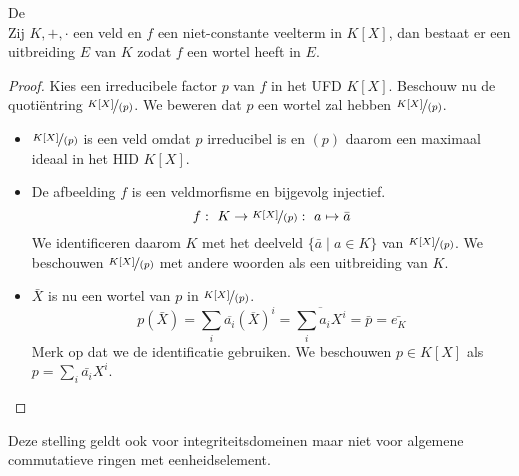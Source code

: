 \documentclass[main.tex]{subfiles}
\begin{document}
\begin{st}
  \label{st:fundamentele-stelling-van-veldentheorie}
  \examen
  De \\
  Zij $K,+,\cdot$ een veld en $f$ een niet-constante veelterm in $K[X]$, dan bestaat er een uitbreiding $E$ van $K$ zodat $f$ een wortel heeft in $E$.

  \begin{proof}
    Kies een irreducibele factor $p$ van $f$ in het UFD $K[X]$.
    Beschouw nu de quoti\"entring $\nicefrac{K[X]}{(p)}$.
    We beweren dat $p$ een wortel zal hebben $\nicefrac{K[X]}{(p)}$.
    \begin{itemize}
    \item $\nicefrac{K[X]}{(p)}$ is een veld omdat $p$ irreducibel is en $(p)$ daarom een maximaal ideaal in het HID $K[X]$.
    \item De afbeelding $f$ is een veldmorfisme en bijgevolg injectief.
      \[ f:\ K \rightarrow \nicefrac{K[X]}{(p)}:\ a \mapsto \bar{a} \]
      We identificeren daarom $K$ met het deelveld $\{ \bar{a} \mid a\in K \}$ van $\nicefrac{K[X]}{(p)}$.
      We beschouwen $\nicefrac{K[X]}{(p)}$ met andere woorden als een uitbreiding van $K$.
    \item $\bar{X}$ is nu een wortel van $p$ in $\nicefrac{K[X]}{(p)}$.
      \[ p(\bar{X}) = \sum_{i}\overline{a_{i}}(\overline{X})^{i}= \overline{\sum_{i}a_{i}X^{i}} = \bar{p} = \bar{e_{K}} \]
      Merk op dat we de identificatie gebruiken.
      We beschouwen $p\in K[X]$ als $p = \sum_{i}\bar{a_{i}}X^{i}$.
    \end{itemize}
  \end{proof}
\end{st}

\begin{opm}
  Deze stelling geldt ook voor integriteitsdomeinen
  maar niet voor algemene commutatieve ringen met eenheidselement.
\end{opm}
\end{document}
